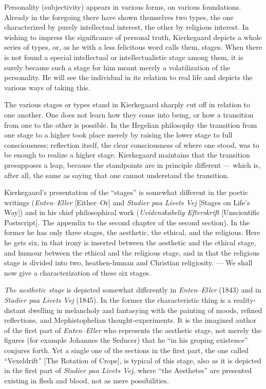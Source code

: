 \documentclass[12pt,a4paper]{book}
\newcommand{\opage}[1]{\marginnote{\footnotesize\textit{[#1]}}}
\begin{document}
Personality (subjectivity) appears in various forms, on various foundations. Already in the
foregoing there have shown themselves two types, the one characterized by purely intellectual
interest, the other by religious interest. In wishing to impress the significance of personal
truth, Kierkegaard depicts a whole series of types, or, as he with a less felicitous word
calls them, stages. When there is not found a special intellectual or intellectualistic stage
among them, it is surely because such a stage for him meant merely a volatilization of the
personality. He will see the individual in its relation to real life and depicts the various
ways of taking this.

The various stages or types stand in Kierkegaard sharply cut off in relation to one another.
One does not learn how they come into being, or how a transition from one to the other is
possible. In the Hegelian philosophy the transition from one stage to a higher took place
merely by raising the lower stage to full consciousness; reflection itself, the clear
consciousness of where one stood, was to be enough to realize a higher stage. Kierkegaard
maintains that the transition presupposes a leap, because the standpoints are in principle
different --- which is, after all, the same as saying that one cannot understand the
transition.

Kierkegaard's presentation of the ``stages'' is somewhat different in the poetic writings
(\emph{Enten--Eller} [Either--Or] and \emph{Stadier paa Livets Vej} [Stages on Life's Way])
and in his chief philosophical work (\emph{Uvidenskabelig Efterskrift} [Unscientific
Postscript]. The appendix to the second chapter of the second section). \opage{157}In the former he has
only three stages, the aesthetic, the ethical, and the religious. Here he gets six, in that
irony is inserted between the aesthetic and the ethical stage, and humour between the ethical
and the religious stage, and in that the religious stage is divided into two, heathen-human
and Christian religiosity. --- We shall now give a characterization of these six stages.

\emph{The aesthetic stage} is depicted somewhat differently in \emph{Enten--Eller} (1843) and
in \emph{Stadier paa Livets Vej} (1845). In the former the characteristic thing is a
reality-distant dwelling in melancholy and fantasying with the painting of moods, refined
reflections, and Mephistophelian thought-experiments. It is the imagined author of the first
part of \emph{Enten--Eller} who represents the aesthetic stage, not merely the figures (for
example Johannes the Seducer) that he ``in his groping existence'' conjures forth. Yet a
single one of the sections in the first part, the one called ``Vexeldrift'' [The Rotation of
Crops], is typical of this stage, also as it is depicted in the first part of \emph{Stadier
paa Livets Vej}, where ``the Aesthetes'' are presented existing in flesh and blood, not as
mere possibilities.
\end{document}
